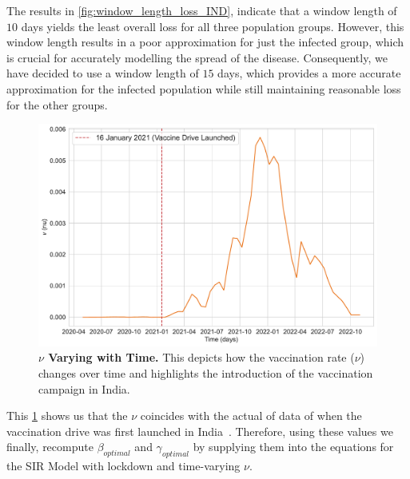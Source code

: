 \documentclass[tikz,fleqn,12pt]{wlscirep}
\begin{document}
The results in \cref{fig:window_length_loss_IND}, indicate that a window length of $10$ days yields the least overall loss for all three population groups. However, this window length results in a poor approximation for just the infected group, which is crucial for accurately modelling the spread of the disease. Consequently, we have decided to use a window length of $15$ days, which provides a more accurate approximation for the infected population while still maintaining reasonable loss for the other groups.

\begin{figure}[htbp!]
  \centering
  \includegraphics[scale=0.35]{images/interpolated_nu_varying_with_time_IND.pdf}
  \caption{\textbf{$\nu$ Varying with Time.} This depicts how the vaccination rate ($\nu$) changes over time and highlights the introduction of the vaccination campaign in India.}
  \label{fig:interpolated_nu_varying_with_time_IND}
\end{figure}

This \cref{fig:interpolated_nu_varying_with_time_IND} shows us that the $\nu$ coincides with the actual of data of when the vaccination drive was first launched in India~\cite{UnicefCovidVaccine}. Therefore, using these values we finally, recompute $\beta_{optimal}$ and $\gamma_{optimal}$ by supplying them into the equations for the SIR Model with lockdown and time-varying $\nu$.
\end{document}
